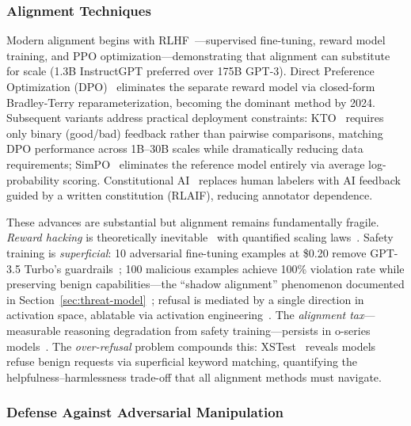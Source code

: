 \subsubsection{Alignment Techniques}
\label{sec:alignment-tech}

Modern alignment begins with RLHF~\cite{ouyang2022rlhf}---supervised fine-tuning, reward model training, and PPO optimization---demonstrating that alignment can substitute for scale (1.3B InstructGPT preferred over 175B GPT-3). Direct Preference Optimization (DPO)~\cite{rafailov2023dpo} eliminates the separate reward model via closed-form Bradley-Terry reparameterization, becoming the dominant method by 2024. Subsequent variants address practical deployment constraints: KTO~\cite{ethayarajh2024kto} requires only binary (good/bad) feedback rather than pairwise comparisons, matching DPO performance across 1B--30B scales while dramatically reducing data requirements; SimPO~\cite{meng2024simpo} eliminates the reference model entirely via average log-probability scoring. Constitutional AI~\cite{bai2022constitutionalai} replaces human labelers with AI feedback guided by a written constitution (RLAIF), reducing annotator dependence.

These advances are substantial but alignment remains fundamentally fragile. \emph{Reward hacking} is theoretically inevitable~\cite{skalse2022rewardhacking} with quantified scaling laws~\cite{gao2023scalinglaws}. Safety training is \emph{superficial}: 10 adversarial fine-tuning examples at \$0.20 remove GPT-3.5 Turbo's guardrails~\cite{qi2024finetuning}; 100 malicious examples achieve 100\% violation rate while preserving benign capabilities---the ``shadow alignment'' phenomenon documented in Section~\ref{sec:threat-model}~\cite{yang2023shadow}; refusal is mediated by a single direction in activation space, ablatable via activation engineering~\cite{arditi2024refusal}. The \emph{alignment tax}---measurable reasoning degradation from safety training---persists in o-series models~\cite{huang2025safetytax}. The \emph{over-refusal} problem compounds this: XSTest~\cite{rottger2024xstest} reveals models refuse benign requests via superficial keyword matching, quantifying the helpfulness--harmlessness trade-off that all alignment methods must navigate.


\subsubsection{Defense Against Adversarial Manipulation}
\label{sec:defense}

